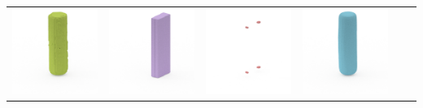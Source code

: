 \documentclass[10pt,onecolumn,letterpaper]{article}
\begin{document}
\begin{tabular}{cccccc}
\includegraphics[height=\turnheight, clip=true, trim=60 30 30 5]{pringles_bbq_NP1_312_gt_view_180.png} &
\includegraphics[height=\turnheight, clip=true, trim=60 30 30 5]{pringles_bbq_NP1_312_bb_view_180.png} &
\includegraphics[height=\turnheight, clip=true, trim=60 30 30 5]{pringles_bbq_NP1_312_zheng_view_180.png} &
\includegraphics[height=\turnheight, clip=true, trim=60 30 30 5]{pringles_bbq_NP1_312_oma_view_180} \\

\end{tabular}
\end{document}
